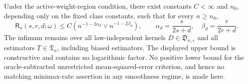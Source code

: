 Under the active-weight-region condition, there exist constants \(C<\infty\) and \(n_0\), depending only on the fixed class constants, such that for every \(n\geq n_0\),
\[
\mathsf R_n(s,r,d;\omega)
\leq C\left(n^{-1-2\alpha_d}\vee n^{-1-2\beta_d}\right),
\qquad
\alpha_d=\frac{s}{2s+d},\quad
\beta_d=\frac{r}{2r+d}.
\]
The infimum remains over all law-independent kernels \(D\in\mathfrak D_{n,\varepsilon}\) and all estimators \(T\in\mathfrak T_n\), including biased estimators.  The displayed upper bound is constructive and contains no logarithmic factor.  No positive lower bound for the oracle-subtracted unrestricted mean-squared-error criterion, and hence no matching minimax-rate assertion in any smoothness regime, is made here.